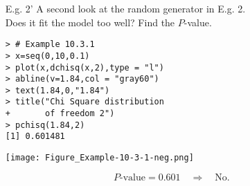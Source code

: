 \begin{frame}[fragile]

\begin{enumerate}
	\item[E.g. 2'] A second look at the random generator in E.g. 2.\\[1em]
		Does it fit the model too well? Find the $P$-value. \\
\vfill
\begin{minipage}{0.4\textwidth}
\centering
\begin{lstlisting}
> # Example 10.3.1
> x=seq(0,10,0.1)
> plot(x,dchisq(x,2),type = "l")
> abline(v=1.84,col = "gray60")
> text(1.84,0,"1.84")
> title("Chi Square distribution
+       of freedom 2")
> pchisq(1.84,2)
[1] 0.601481
\end{lstlisting}
\end{minipage}
\hfill
\begin{minipage}{0.5\textwidth}
\centering
\texttt{[image: Figure\_Example-10-3-1-neg.png]}
\end{minipage}
\vfill
\[
	P\text{-value} = 0.601\quad\Longrightarrow \quad \text{No.}
\]
\end{enumerate}
\end{frame}
